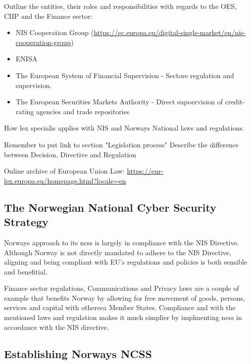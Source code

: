 \begin{followup}
    Outline the entities, their roles and responsibilities with regards to the OES, CIIP and the Finance sector:
    \begin{itemize}
        \item NIS Cooperation Group (\url{https://ec.europa.eu/digital-single-market/en/nis-cooperation-group})
        \item ENISA
        \item The European System of Financial Supervision - Sectore regulation and supervision.
        \item The European Securities Markets Authority - Direct supoervision of credit-rating agencies and trade repositories
    \end{itemize}

    How lex specialis applies with NIS and Norways National laws and regulations.
\end{followup}


\begin{followup}
    Remember to put link to section "Legislation process"
    Describe the difference between Decision, Directive and Regulation
\end{followup}

 Online archive of European Union Law: \url{https://eur-lex.europa.eu/homepage.html?locale=en}

\newpage

\subsection{The Norwegian National Cyber Security Strategy}

Norways approach to its \acrshort{ncss} is largely in compliance with the NIS Directive. Although Norway is not directly mandated to adhere to the NIS Directive, aligning and being compliant with EU's regulations and policies is both sensible and benefitial. 

Finance sector regulations, Communications and Privacy laws are a couple of example that benefits Norway by allowing for free movement of goods, persons, services and capital with other\acrshort{eea} Member States. Compliance and with the mentioned laws and regulation makes it much simplier by implmenting \acrshort{ncss} in accordance with the NIS directive.

\subsection{Establishing Norways NCSS}

